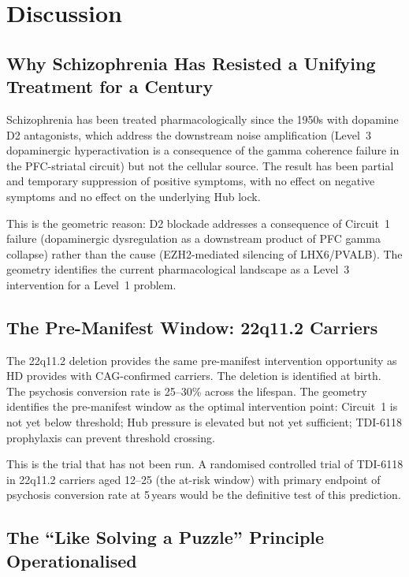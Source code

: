 \documentclass[12pt,a4paper]{article}
\begin{document}
\section{Discussion}

\subsection{Why Schizophrenia Has Resisted a Unifying
Treatment for a Century}

Schizophrenia has been treated pharmacologically since the
1950s with dopamine D2 antagonists, which address the
downstream noise amplification (Level~3 dopaminergic
hyperactivation is a consequence of the gamma coherence
failure in the PFC-striatal circuit) but not the cellular
source. The result has been partial and temporary suppression
of positive symptoms, with no effect on negative symptoms
and no effect on the underlying Hub lock.

This is the geometric reason: D2 blockade addresses a
consequence of Circuit~1 failure (dopaminergic dysregulation
as a downstream product of PFC gamma collapse) rather than
the cause (EZH2-mediated silencing of LHX6/PVALB). The
geometry identifies the current pharmacological landscape as
a Level~3 intervention for a Level~1 problem.

\subsection{The Pre-Manifest Window: 22q11.2 Carriers}

The 22q11.2 deletion provides the same pre-manifest
intervention opportunity as HD provides with CAG-confirmed
carriers. The deletion is identified at birth. The psychosis
conversion rate is 25--30\% across the lifespan. The
geometry identifies the pre-manifest window as the optimal
intervention point: Circuit~1 is not yet below threshold;
Hub pressure is elevated but not yet sufficient; TDI-6118
prophylaxis can prevent threshold crossing.

This is the trial that has not been run. A randomised
controlled trial of TDI-6118 in 22q11.2 carriers aged 12--25
(the at-risk window) with primary endpoint of psychosis
conversion rate at 5\,years would be the definitive test of
this prediction.

\subsection{The ``Like Solving a Puzzle'' Principle
Operationalised}
\end{document}
